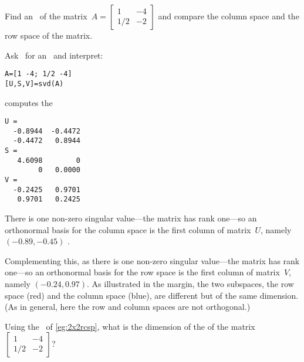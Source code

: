 \begin{example} \label{eg:2x2rcsp}
Find an \svd\ of the matrix~\(A=\begin{bmatrix} 1&-4\\1/2&-2 \end{bmatrix}\) and compare the column space and the row space of the matrix.
\begin{solution} 
Ask \script\ for an \svd\ and interpret:
\begin{verbatim}
A=[1 -4; 1/2 -4]
[U,S,V]=svd(A)
\end{verbatim}
\setbox\ajrqrbox\hbox{}%
\marginpar{\usebox{\ajrqrbox}}%
computes the \svd\ 
\begin{verbatim}
U =
  -0.8944  -0.4472
  -0.4472   0.8944
S =
   4.6098        0
        0   0.0000
V =
  -0.2425   0.9701
   0.9701   0.2425
\end{verbatim}
There is one non-zero singular value---the matrix has rank one---so an orthonormal basis for the column space is the first column of matrix~\(U\), namely \((-0.89,-0.45)\) \twodp.

%
Complementing this, as there is one non-zero singular value---the matrix has rank one---so an orthonormal basis for the row space is the first column of matrix~\(V\), namely \((-0.24,0.97)\).
As illustrated in the margin, the two subspaces, the row space (red) and the column space (blue), are different but of the same dimension.
(As in general, here the row and column spaces are not orthogonal.)
\end{solution}
\end{example}



\begin{activity}
Using the \svd\ of \autoref{eg:2x2rcsp}, what is the dimension of the  of the matrix~\(\begin{bmatrix} 1&-4\\1/2&-2 \end{bmatrix}\)?
\actposs[4]1230
\end{activity}


